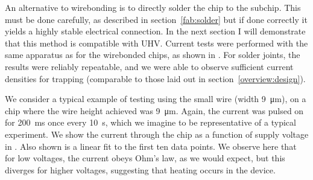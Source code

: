 An alternative to wirebonding is to directly solder the chip to the subchip.
This must be done carefully, as described in section~\ref{fab:solder} but if
done correctly it yields a highly stable electrical connection. In the next
section I will demonstrate that this method is compatible with UHV. Current
tests were performed with the same apparatus as for the wirebonded chips, as
shown in . For solder joints, the results were
reliably repeatable, and we were able to observe sufficient current densities
for trapping (comparable to those laid out in section~\ref{overview:design}).

We consider a typical example of testing using the small wire
(width \SI{9}{\micro\meter}), on a chip where the wire height achieved was
\SI{9}{\micro\meter}. Again, the current was pulsed on for
\SI{200}{\milli\second} once every \SI{10}{\second}, which we imagine to be
representative of a typical experiment. We show the current through the chip as
a function of supply voltage in . Also shown
is a linear fit to the first ten data points. We observe here that for low
voltages, the current obeys Ohm's law, as we would expect, but this diverges
for higher voltages, suggesting that heating occurs in the device.

